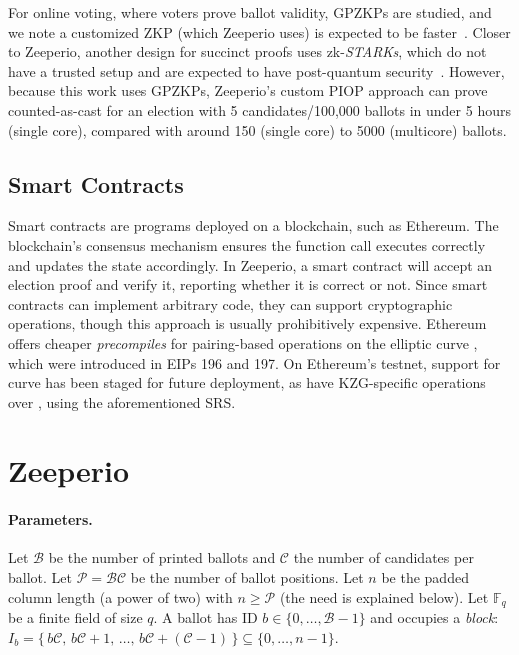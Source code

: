For online voting, where voters prove ballot validity, GPZKPs are studied, and we note a customized ZKP (which Zeeperio uses) is expected to be faster~\cite{HKJR24}. 
Closer to Zeeperio, another design for succinct proofs uses zk-{\em STARKs}, which do not have a trusted setup and are expected to have post-quantum security~\cite{HT25}. 
However, because this work uses GPZKPs, Zeeperio's custom PIOP approach can prove counted-as-cast for an election with 5 candidates/100,000 ballots in under 5 hours (single core), compared with around 150 (single core) to 5000 (multicore) ballots.

\subsection{Smart Contracts}

Smart contracts are programs deployed on a blockchain, such as Ethereum. 
The blockchain's consensus mechanism ensures the function call executes correctly and updates the state accordingly. 
In Zeeperio, a smart contract will accept an election proof and verify it, reporting whether it is correct or not. 
Since smart contracts can implement arbitrary code, they can support cryptographic operations, though this approach is usually prohibitively expensive. 
Ethereum offers cheaper \emph{precompiles} for pairing-based operations on the elliptic curve \altbn, which were introduced in EIPs 196 and 197.
On Ethereum's testnet, support for curve \bls has been staged for future deployment, as have KZG-specific operations over \bls, using the aforementioned SRS.

\section{Zeeperio}
\label{sec:constraints} 

\paragraph{Parameters.}
Let $\mathcal{B}$ be the number of printed ballots and $\mathcal{C}$ the number of candidates per ballot. 
Let $\mathcal{P}=\mathcal{B}\mathcal{C}$ be the number of ballot positions. 
Let $n$ be the padded column length (a power of two) with $n\ge \mathcal{P}$ (the need is explained below). 
Let $\mathbb{F}_q$ be a finite field of size $q$. 
A ballot has ID $b\in\{0,\dots,\mathcal{B}-1\}$ and occupies a \emph{block}: $I_b=\{\,b\mathcal{C},\,b\mathcal{C}+1,\,\dots,\,b\mathcal{C}+(\mathcal{C}-1)\,\}\subseteq\{0,\dots,n-1\}.$


